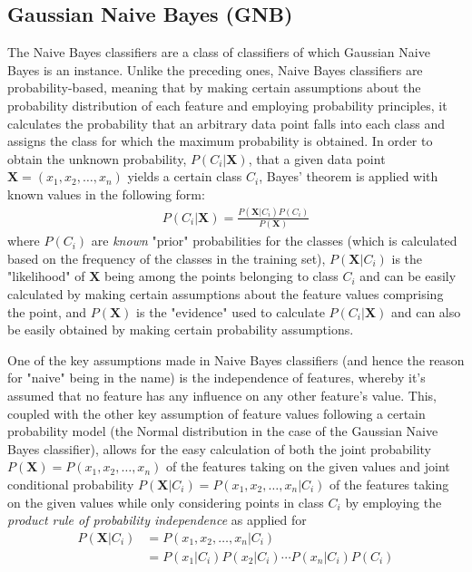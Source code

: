 \documentclass[journal,twocolumn,12pt,twoside]{IEEEtran}
\begin{document}
\subsection{Gaussian Naive Bayes (GNB)}
The Naive Bayes classifiers are a class of classifiers of which Gaussian Naive Bayes is an instance. Unlike the preceding ones, Naive Bayes classifiers are probability-based, meaning that by making certain assumptions about the probability distribution of each feature and employing probability principles, it calculates the probability that an arbitrary data point falls into each class and assigns the class for which the maximum probability is obtained. In order to obtain the unknown probability, $P(C_i|\mathbf{X})$, that a given data point $\mathbf{X}=(x_1,x_2,\ldots,x_n)$ yields a certain class $C_i$, Bayes' theorem is applied with known values in the following form: 
\begin{align*}
    P(C_i|\mathbf{X}) = \frac{P(\mathbf{X}|C_i)P(C_i)}{P(\mathbf{X})}
\end{align*}
where $P(C_i)$ are \textit{known} "prior" probabilities for the classes (which is calculated based on the frequency of the classes in the training set), $P(\mathbf{X}|C_i)$ is the "likelihood" of $\mathbf{X}$ being among the points belonging to class $C_i$ and can be easily calculated by making certain assumptions about the feature values comprising the point, and $P(\mathbf{X})$ is the "evidence" used to calculate $P(C_i|\mathbf{X})$ and can also be easily obtained by making certain probability assumptions.
\par One of the key assumptions made in Naive Bayes classifiers (and hence the reason for "naive" being in the name) is the independence of features, whereby it's assumed that no feature has any influence on any other feature's value. This, coupled with the other key assumption of feature values following a certain probability model (the Normal distribution in the case of the Gaussian Naive Bayes classifier), allows for the easy calculation of both the joint probability $P(\mathbf{X})=P(x_1,x_2,\ldots,x_n)$ of the features taking on the given values and joint conditional probability $P(\mathbf{X}|C_i)=P(x_1,x_2,\ldots,x_n|C_i)$ of the features taking on the given values while only considering points in class $C_i$ by employing the \textit{product rule of probability independence} as applied for
\begin{align*}
    P(\mathbf{X}|C_i)&=P(x_1,x_2,\ldots,x_n|C_i)\\
    &=P(x_1|C_i)P(x_2|C_i)\cdots P(x_n|C_i)P(C_i)
\end{align*}
\end{document}
